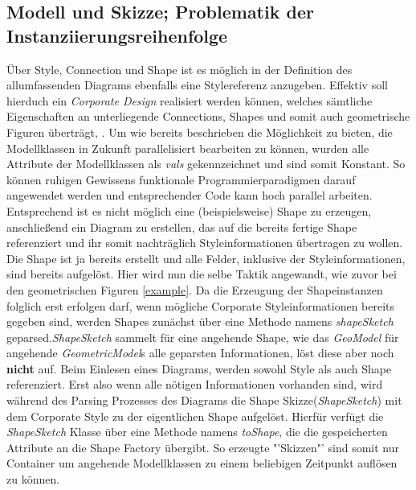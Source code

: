 \subsection{Modell und Skizze; Problematik der Instanziierungsreihenfolge}\label{skizze}
Über Style, Connection und Shape  ist es möglich in der Definition des allumfassenden Diagrams ebenfalls eine Stylereferenz anzugeben. Effektiv soll hierduch ein \textit{Corporate Design} realisiert werden können, welches sämtliche Eigenschaften an unterliegende Connections, Shapes und somit auch geometrische Figuren überträgt, \citet[3 Approach]{gerhart:modigen_concept}. Um wie bereits beschrieben die Möglichkeit zu bieten, die Modellklassen in Zukunft parallelisiert bearbeiten zu können, wurden alle Attribute der Modellklassen als \textit{vals} gekennzeichnet und sind somit Konstant. So können ruhigen Gewissens funktionale Programmierparadigmen darauf angewendet werden und entsprechender Code kann hoch parallel arbeiten. Entsprechend ist es nicht möglich eine (beispielsweise) Shape zu erzeugen, anschließend ein Diagram zu erstellen, das auf die bereits fertige Shape referenziert und ihr somit nachträglich Styleinformationen übertragen zu wollen. Die Shape ist ja bereits erstellt und alle Felder, inklusive der Styleinformationen, sind bereits aufgelöst. Hier wird nun die selbe Taktik angewandt, wie zuvor bei den geometrischen Figuren \ref{example}. Da die Erzeugung der Shapeinstanzen folglich erst erfolgen darf, wenn mögliche Corporate Styleinformationen bereits gegeben sind, werden Shapes zunächst über eine Methode namens \textit{shapeSketch} geparsed.\textit{ShapeSketch} sammelt für eine angehende Shape, wie das \textit{GeoModel} für angehende \textit{GeometricModel}s alle geparsten Informationen, löst diese aber noch \textbf{nicht} auf. Beim Einlesen eines Diagrams, werden sowohl Style als auch Shape referenziert. Erst also wenn alle nötigen Informationen vorhanden sind, wird während des Parsing Prozesses des Diagrams die Shape Skizze(\textit{ShapeSketch}) mit dem Corporate Style zu der eigentlichen Shape aufgelöst. Hierfür verfügt die \textit{ShapeSketch} Klasse über eine Methode namens \textit{toShape}, die die gespeicherten Attribute an die Shape Factory übergibt. So erzeugte "'Skizzen"' sind somit nur Container um angehende Modellklassen zu einem beliebigen Zeitpunkt auflösen zu können.

